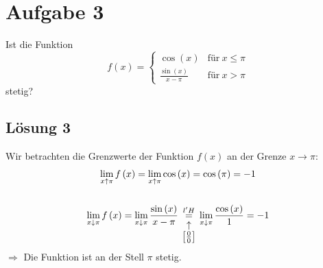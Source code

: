 \documentclass[main.tex]{subfiles}
\begin{document}
\section{Aufgabe 3}
Ist die Funktion
\begin{equation*}
    f\left( x\right) =\begin{cases}
    \cos\left( x\right) & \text{für} \ x\leq \pi \\
    \frac{\sin\left( x\right)}{x-\pi } & \text{für} \ x >\pi
    \end{cases}
\end{equation*}
stetig?

\subsection{Lösung 3}
Wir betrachten die Grenzwerte der Funktion $f\left( x\right)$ an der Grenze $x\rightarrow \pi $:
\begin{gather*}
\lim\limits _{x\uparrow \pi } f\left( x\right) =\lim\limits _{x\uparrow \pi }\cos\left( x\right) =\cos\left( \pi \right) =-1\\
\\
\lim\limits _{x\downarrow \pi } f\left( x\right) =\lim\limits _{x\downarrow \pi }\frac{\sin\left( x\right)}{x-\pi }\underset{ \arraycolsep=1pt\def\arraystretch{1} %
\begin{array}{c}
\uparrow \\
\left[\frac{0}{0}\right]
\end{array}}{\overset{l'H}{=}}\lim\limits _{x\downarrow \pi }\frac{\cos\left( x\right)}{1} =-1
\end{gather*}
$\Rightarrow$ Die Funktion ist an der Stell $\pi $ stetig.
\end{document}
